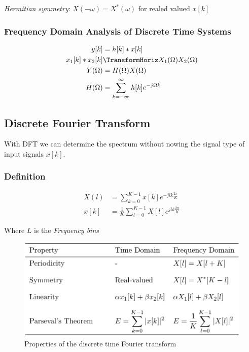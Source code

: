 \documentclass{article}
\begin{document}


\textit{Hermitian symmetry}: $X(-\omega)=X^*(\omega)$ for realed valued $x[k]$

\subsubsection{Frequency Domain Analysis of Discrete Time Systems}
\begin{align*}
    y[k] &= h[k]*x[k] \\
    x_1[k]*x_2[k] &\TransformHoriz  X_1(\Omega)X_2(\Omega) \\
    Y(\Omega) &= H(\Omega)X(\Omega) \\
    H(\Omega) &= \sum_{k=-\infty}^{\infty} h[k]e^{-j\Omega k}
\end{align*}


\newpage
\subsection{Discrete Fourier Transform}
With DFT we can determine the spectrum without nowing the signal type
of input signals $x[k]$.

\subsubsection{Definition}
\begin{align*}
    X(l) &= \sum_{k=0}^{K-1} x[k]e^{-jlk\frac{2\pi}{K}} \\
    x[k] &= \frac{1}{K}\sum_{l=0}^{K-1}X[l]e^{jlk\frac{2\pi}{K}}
\end{align*}

Where $L$ is the \textit{Frequency bins}

\begin{figure}[!h]
    \centering
    \includegraphics[width=12cm]{image/properties_of_the_dft.png}
    \caption{Properties of the discrete time Fourier transform}
    \label{fig:properties_of_the_dft}
\end{figure}
\end{document}
